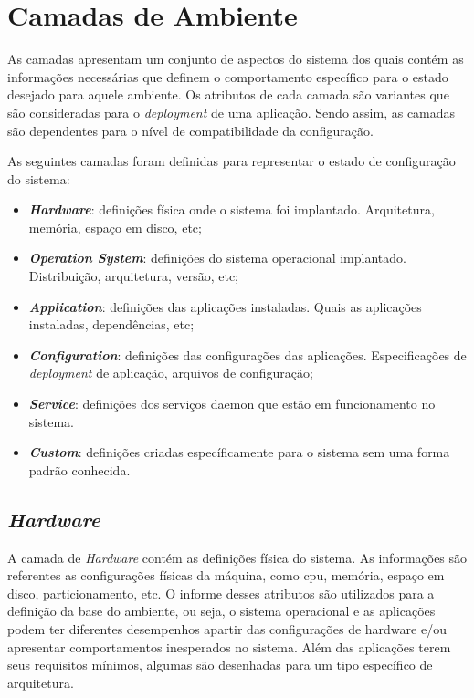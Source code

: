 \section{Camadas de Ambiente}
\label{sec:cam-amb}

As camadas apresentam um conjunto de aspectos do sistema dos quais contém as
informações necessárias que definem o comportamento específico para o
estado desejado para aquele ambiente. Os atributos de cada camada são variantes
que são consideradas para o \textit{deployment} de uma aplicação. Sendo assim, as
camadas são dependentes para o nível de compatibilidade da configuração.

As seguintes camadas foram definidas para representar o estado de configuração do
sistema:
\begin{itemize}
  \item \textit{\textbf{Hardware}}: definições física onde o sistema foi implantado.
    Arquitetura, memória, espaço em disco, etc;
  \item \textit{\textbf{Operation System}}: definições do sistema operacional
    implantado. Distribuição, arquitetura, versão, etc;
  \item \textit{\textbf{Application}}: definições das aplicações instaladas.
    Quais as aplicações instaladas, dependências, etc;
  \item \textit{\textbf{Configuration}}: definições das configurações das
    aplicações. Especificações de \textit{deployment} de aplicação, arquivos
    de configuração;
  \item \textit{\textbf{Service}}: definições dos serviços daemon que estão em
    funcionamento no sistema.
  \item \textit{\textbf{Custom}}: definições criadas específicamente para o
    sistema sem uma forma padrão conhecida.
\end{itemize}

\subsection{\textit{Hardware}}
\label{sec:cam-hard}

A camada de \textit{Hardware} contém as definições física do sistema.
As informações são referentes as configurações físicas da máquina, como
cpu, memória, espaço em disco, particionamento, etc. O informe desses atributos
são utilizados para a definição da base do ambiente, ou seja, o sistema
operacional e as aplicações podem ter diferentes desempenhos apartir das
configurações de hardware e/ou apresentar comportamentos inesperados no sistema.
Além das aplicações terem seus requisitos mínimos, algumas são desenhadas
para um tipo específico de arquitetura.

